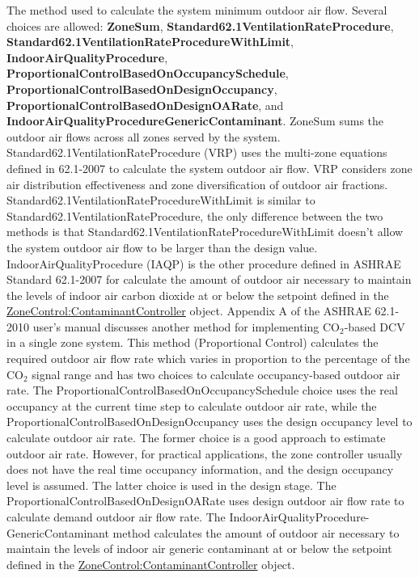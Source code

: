 The method used to calculate the system minimum outdoor air flow. Several choices are allowed: \textbf{ZoneSum}, \textbf{Standard62.1VentilationRateProcedure}, \textbf{Standard62.1VentilationRateProcedureWithLimit}, \textbf{IndoorAirQualityProcedure}, \textbf{ProportionalControlBasedOnOccupancySchedule}, \textbf{ProportionalControlBasedOnDesignOccupancy}, \textbf{ProportionalControlBasedOnDesignOARate}, and \textbf{IndoorAirQualityProcedureGenericContaminant}. ZoneSum sums the outdoor air flows across all zones served by the system. Standard62.1VentilationRateProcedure (VRP) uses the multi-zone equations defined in 62.1-2007 to calculate the system outdoor air flow. VRP considers zone air distribution effectiveness and zone diversification of outdoor air fractions. Standard62.1VentilationRateProcedureWithLimit is similar to Standard62.1VentilationRateProcedure, the only difference between the two methods is that Standard62.1VentilationRateProcedureWithLimit doesn't allow the system outdoor air flow to be larger than the design value. IndoorAirQualityProcedure (IAQP) is the other procedure defined in ASHRAE Standard 62.1-2007 for calculate the amount of outdoor air necessary to maintain the levels of indoor air carbon dioxide at or below the setpoint defined in the \hyperref[zonecontrolcontaminantcontroller]{ZoneControl:ContaminantController} object. Appendix A of the ASHRAE 62.1-2010 user's manual discusses another method for implementing CO\(_{2}\)-based DCV in a single zone system. This method (Proportional Control) calculates the required outdoor air flow rate which varies in proportion to the percentage of the CO\(_{2}\) signal range and has two choices to calculate occupancy-based outdoor air rate. The ProportionalControlBasedOnOccupancySchedule choice uses the real occupancy at the current time step to calculate outdoor air rate, while the ProportionalControlBasedOnDesignOccupancy uses the design occupancy level to calculate outdoor air rate. The former choice is a good approach to estimate outdoor air rate. However, for practical applications, the zone controller usually does not have the real time occupancy information, and the design occupancy level is assumed. The latter choice is used in the design stage. The ProportionalControlBasedOnDesignOARate uses design outdoor air flow rate to calculate demand outdoor air flow rate. The IndoorAirQualityProcedure-GenericContaminant method calculates the amount of outdoor air necessary to maintain the levels of indoor air generic contaminant at or below the setpoint defined in the \hyperref[zonecontrolcontaminantcontroller]{ZoneControl:ContaminantController} object.

